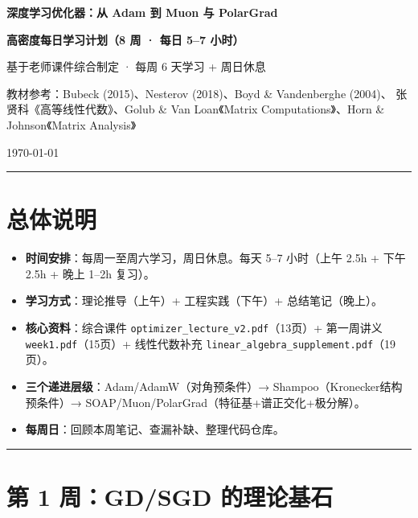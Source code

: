 \documentclass[11pt,a4paper]{ctexart}
\begin{document}
\begin{center}
{\Huge\bfseries 深度学习优化器：从 Adam 到 Muon 与 PolarGrad}

\vspace{0.5cm}
{\Large\bfseries 高密度每日学习计划（8 周 · 每日 5--7 小时）}

\vspace{0.3cm}
{\large 基于老师课件综合制定 · 每周 6 天学习 + 周日休息}

\vspace{0.3cm}
{\normalsize 教材参考：Bubeck (2015)、Nesterov (2018)、Boyd \& Vandenberghe (2004)、}
{\normalsize 张贤科《高等线性代数》、Golub \& Van Loan《Matrix Computations》、Horn \& Johnson《Matrix Analysis》}

\vspace{0.3cm}
\today
\end{center}

\vspace{0.3cm}
\rule{\textwidth}{0.5pt}

\section*{总体说明}

\begin{itemize}
  \item \textbf{时间安排}：每周一至周六学习，周日休息。每天 5--7 小时（上午 2.5h + 下午 2.5h + 晚上 1--2h 复习）。
  \item \textbf{学习方式}：理论推导（上午）+ 工程实践（下午）+ 总结笔记（晚上）。
  \item \textbf{核心资料}：综合课件 \texttt{optimizer\_lecture\_v2.pdf}（13页）+ 第一周讲义 \texttt{week1.pdf}（15页）+ 线性代数补充 \texttt{linear\_algebra\_supplement.pdf}（19页）。
  \item \textbf{三个递进层级}：Adam/AdamW（对角预条件）→ Shampoo（Kronecker结构预条件）→ SOAP/Muon/PolarGrad（特征基+谱正交化+极分解）。
  \item \textbf{每周日}：回顾本周笔记、查漏补缺、整理代码仓库。
\end{itemize}

\rule{\textwidth}{0.5pt}
\newpage

\section{第 1 周：GD/SGD 的理论基石}
\end{document}
